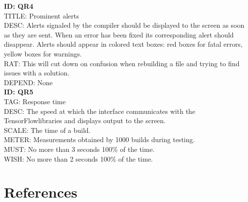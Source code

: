 \documentclass[journal,10pt,onecolumn,compsoc]{IEEEtran} \usepackage[margin=1.0in]{geometry} \usepackage{pdfpages} \usepackage{graphicx}
\begin{document}
\noindent
\textbf{ID: QR4}\\
TITLE: Prominent alerts\\
DESC: Alerts signaled by the compiler should be displayed to the screen as soon as they are sent. 
When an error has been fixed its corresponding alert should disappear.
Alerts should appear in colored text boxes: red boxes for fatal errors, yellow boxes for warnings.\\
RAT: This will cut down on confusion when rebuilding a file and trying to find issues with a solution.\\
DEPEND: None\\

\noindent
\textbf{ID: QR5}\\
TAG: Response time\\
DESC: The speed at which the interface communicates with the TensorFlow\texttrademark libraries and displays output to the screen.\\
SCALE: The time of a build.\\
METER: Measurements obtained by 1000 builds during testing.\\
MUST: No more than 3 seconds 100\% of the time.\\
WISH: No more than 2 seconds 100\% of the time.\\

\newpage


\newpage
\section{References}

\end{document}
